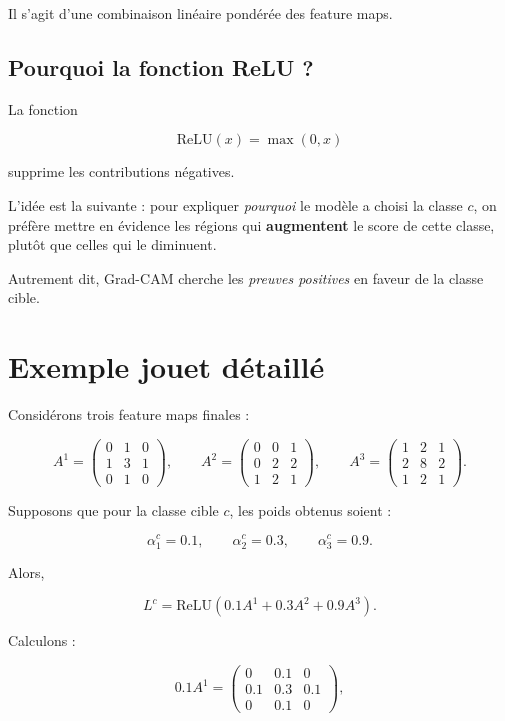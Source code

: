 ﻿\documentclass[11pt,a4paper]{article}
\begin{document}
Il s'agit d'une combinaison linéaire pondérée des feature maps.

\subsection{Pourquoi la fonction ReLU ?}

La fonction

\[
\mathrm{ReLU}(x)=\max(0,x)
\]

supprime les contributions négatives.

L'idée est la suivante : pour expliquer \emph{pourquoi} le modèle a choisi la classe $c$, on préfère mettre en évidence les régions qui \textbf{augmentent} le score de cette classe, plutôt que celles qui le diminuent.

Autrement dit, Grad-CAM cherche les \emph{preuves positives} en faveur de la classe cible.

\section{Exemple jouet détaillé}

Considérons trois feature maps finales :

\[
A^1=
\begin{pmatrix}
0 & 1 & 0 \\
1 & 3 & 1 \\
0 & 1 & 0
\end{pmatrix},
\qquad
A^2=
\begin{pmatrix}
0 & 0 & 1 \\
0 & 2 & 2 \\
1 & 2 & 1
\end{pmatrix},
\qquad
A^3=
\begin{pmatrix}
1 & 2 & 1 \\
2 & 8 & 2 \\
1 & 2 & 1
\end{pmatrix}.
\]

Supposons que pour la classe cible $c$, les poids obtenus soient :

\[
\alpha_1^c = 0.1,
\qquad
\alpha_2^c = 0.3,
\qquad
\alpha_3^c = 0.9.
\]

Alors,

\[
L^c = \mathrm{ReLU}(0.1A^1 + 0.3A^2 + 0.9A^3).
\]

Calculons :

\[
0.1A^1=
\begin{pmatrix}
0 & 0.1 & 0 \\
0.1 & 0.3 & 0.1 \\
0 & 0.1 & 0
\end{pmatrix},
\]
\end{document}
